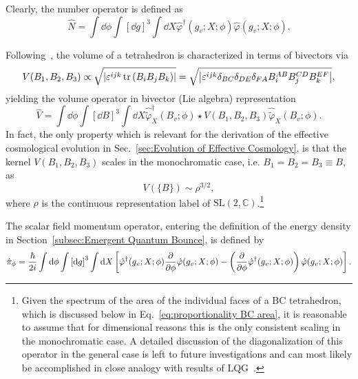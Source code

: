 \documentclass[11pt,a4paper]{article}
\newcommand{\C}{\mathbb C}
\newcommand{\SL}{\text{SL$(2,\C)$}}
\begin{document}
Clearly, the number operator is defined as
%
\begin{equation}\label{eq:definition of relational number operator}
\hat{N}
=
\int\dd{\phi}\int\left[\dd{g}\right]^3\int\dd{X}\hat{\varphi}^{\dagger}(g_v;X;\phi)\hat{\varphi}(g_v;X;\phi).
\end{equation}
%

Following~\cite{Barrett:1997gw}, the volume of a tetrahedron is characterized in terms of bivectors via 
%
\begin{equation}
V(B_1,B_2,B_3)\propto\sqrt{\abs{\varepsilon^{ijk}\tr\left(B_i B_j B_k\right)}} = \sqrt{\abs{\varepsilon^{ijk}\delta_{BC}\delta_{DE}\delta_{FA}B_i^{AB}B_j^{CD}B_k^{EF}}},
\end{equation}
%
yielding the volume operator in bivector (Lie algebra) representation
%
\begin{equation}\label{eq:definition of volume operator}
\hat{V}=\int\dd{\phi}\int\left[\dd{B}\right]^3\int\dd{X}\hat{\tilde{\varphi}}^{\dagger}_X(B_v;\phi)\star V(B_1,B_2,B_3)\hat{\tilde{\varphi}}_X(B_v;\phi).
\end{equation}
%
In fact, the only property which is relevant for the derivation of the effective cosmological evolution in Sec.~\ref{sec:Evolution of Effective Cosmology}, is that the kernel $V(B_1,B_2,B_3)$ scales in the monochromatic case, i.e. $B_1 = B_2 = B_3 \equiv B$, as
%
\begin{equation}
V(\{B\})\sim\rho^{3/2},
\end{equation}
%
where $\rho$ is the continuous representation label of $\SL$.\footnote{Given the spectrum of the area of the individual faces of a BC tetrahedron, which is discussed below in Eq.~\eqref{eq:proportionality BC area}, it is reasonable to assume that for dimensional reasons this is the only consistent scaling in the monochromatic case. A detailed discussion of the diagonalization of this operator in the general case is left to future investigations and can most likely be accomplished in close analogy with results of LQG~\cite{Rovelli:1994ge,Barbieri:1997ks,Brunnemann:2004xi,Ding:2009jq}.}

The scalar field momentum operator, entering the definition of the energy density in Section~\ref{subsec:Emergent Quantum Bounce}, is defined by
%
\begin{equation}\label{eq:clock conjugate momentum operator}
\hat{\pi}_{\phi}
=
\frac{\hbar}{2i}\int\dd{\phi}\int\left[\dd{g}\right]^3\int\dd{X}\left[\hat{\varphi}^{\dagger}(g_v;X;\phi)\pdv{}{\phi}\hat{\varphi}(g_v;X;\phi) - \left(\pdv{}{\phi}\hat{\varphi}^{\dagger}(g_v;X;\phi)\right)\hat{\varphi}(g_v;X;\phi)\right].
\end{equation}
%
\end{document}
